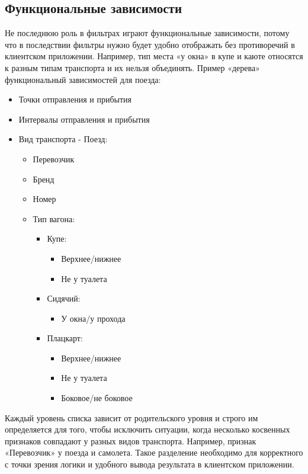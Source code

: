 \subsection{Функциональные зависимости}
Не последнюю роль в фильтрах играют функциональные зависимости, потому что в последствии фильтры нужно будет удобно отображать без противоречий в клиентском приложении. Например, тип места «у окна» в купе и каюте относятся к разным типам транспорта и их нельзя объединять. Пример «дерева» функциональный зависимостей для поезда:
\begin{itemize}
    \item Точки отправления и прибытия
    \item Интервалы отправления и прибытия
	\item Вид транспорта - Поезд:
	\begin{itemize}
		\item Перевозчик
		\item Бренд
		\item Номер
		\item Тип вагона:
		\begin{itemize}
			\item Купе:
			\begin{itemize}
				\item Верхнее/нижнее
				\item Не у туалета
			\end{itemize}
			\item Сидячий:
			\begin{itemize}
				\item У окна/у прохода
			\end{itemize}
			\item Плацкарт:
			\begin{itemize}
				\item Верхнее/нижнее
				\item Не у туалета
				\item Боковое/не боковое
			\end{itemize}
		\end{itemize}
	\end{itemize}
\end{itemize}

Каждый уровень списка зависит от родительского уровня и строго им определяется для того, чтобы исключить ситуации, когда несколько косвенных признаков совпадают у разных видов транспорта. Например, признак «Перевозчик» у поезда и самолета. Такое разделение необходимо для корректного с точки зрения логики и удобного вывода результата в клиентском приложении.

